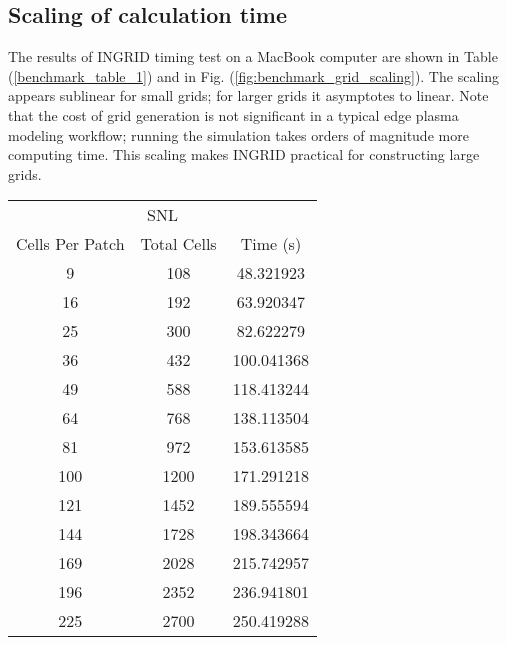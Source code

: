 \subsection{Scaling of calculation time}
The results of INGRID timing test on a MacBook computer are shown in
Table (\ref{benchmark_table_1}) and in
Fig. (\ref{fig:benchmark_grid_scaling}). The scaling appears sublinear
for small grids; for larger grids it asymptotes to linear. Note that
the cost of grid generation is not significant in a typical edge
plasma modeling workflow; running the simulation takes orders of
magnitude more computing time. This scaling makes INGRID practical for constructing large grids.\\

\begin{tabular}{|c|c|c|}
    \toprule
    \multicolumn{3}{|c|}{SNL}\\
    \cline{1-3}
    {Cells Per Patch} & Total Cells &    Time (s) \\
    \midrule
    9  &       108 &   48.321923 \\
    16  &       192 &   63.920347 \\
    25  &       300 &   82.622279 \\
    36  &       432 &  100.041368 \\
    49  &       588 &  118.413244 \\
    64  &       768 &  138.113504 \\
    81  &       972 &  153.613585 \\
    100  &      1200 &  171.291218 \\
    121  &      1452 &  189.555594 \\
    144  &      1728 &  198.343664 \\
    169 &      2028 &  215.742957 \\
    196 &      2352 &  236.941801 \\
    225 &      2700 &  250.419288 \\
    \bottomrule
\end{tabular}

